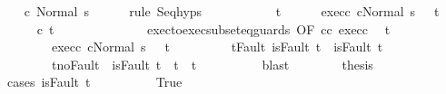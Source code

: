 \begin{isabellebody}
\ \ \isamarkupfalse%
\ {\isachardoublequoteopen}{\isasymGamma}{\isasymturnstile}c{}{\isasymdown}\ Normal\ s{\isachardoublequoteclose}\isanewline
\ \ \ \ \isamarkupfalse%
\ {\isacharparenleft}rule\ Seq{\isachardot}hyps{\isacharparenright}\isanewline
\ \ \isamarkupfalse%
\isanewline
\ \ \isacommand{{\isacharbraceleft}}\isamarkupfalse%
\isanewline
\ \ \ \ \isamarkupfalse%
\ t\isanewline
\ \ \ \ \isamarkupfalse%
\ exec{\isacharunderscore}c{}{\isacharcolon}\ {\isachardoublequoteopen}{\isasymGamma}{\isasymturnstile}{\isasymlangle}c{}{\isacharcomma}Normal\ s\ {\isasymrangle}\ {\isasymRightarrow}\ t{\isachardoublequoteclose}\isanewline
\ \ \ \ \isamarkupfalse%
\ {\isachardoublequoteopen}{\isasymGamma}{\isasymturnstile}c{}{\isasymdown}\ t{\isachardoublequoteclose}\isanewline
\ \ \ \ \isamarkupfalse%
\ {\isacharminus}\isanewline
\ \ \ \ \ \ \isamarkupfalse%
\ exec{\isacharunderscore}to{\isacharunderscore}exec{\isacharunderscore}subseteq{\isacharunderscore}guards\ {\isacharbrackleft}OF\ c{}{\isacharunderscore}c{}{\isacharprime}\ exec{\isacharunderscore}c{}{\isacharbrackright}\ \isamarkupfalse%
\ t{\isacharprime}\ \isanewline
\ \ \ \ \ \ \ \ exec{\isacharunderscore}c{}{\isacharprime}{\isacharcolon}\ {\isachardoublequoteopen}{\isasymGamma}{\isasymturnstile}{\isasymlangle}c{}{\isacharprime}{\isacharcomma}Normal\ s\ {\isasymrangle}\ {\isasymRightarrow}\ t{\isacharprime}{\isachardoublequoteclose}\ \isanewline
\ \ \ \ \ \ \ \ t{\isacharunderscore}Fault{\isacharcolon}\ {\isachardoublequoteopen}isFault\ t\ {\isasymlongrightarrow}\ isFault\ t{\isacharprime}{\isachardoublequoteclose}\ \isanewline
\ \ \ \ \ \ \ \ t{\isacharprime}{\isacharunderscore}noFault{\isacharcolon}\ {\isachardoublequoteopen}{\isasymnot}\ isFault\ t{\isacharprime}\ {\isasymlongrightarrow}\ t{\isacharprime}\ {\isacharequal}\ t{\isachardoublequoteclose}\isanewline
\ \ \ \ \ \ \ \ \isamarkupfalse%
\ blast\isanewline
\ \ \ \ \ \ \isamarkupfalse%
\ {\isacharquery}thesis\isanewline
\ \ \ \ \ \ \isamarkupfalse%
\ {\isacharparenleft}cases\ {\isachardoublequoteopen}isFault\ t{\isacharprime}{\isachardoublequoteclose}{\isacharparenright}\isanewline
\ \ \ \ \ \ \ \ \isamarkupfalse%
\ True\isanewline
\ \ \ \ \ \ \ \ \isamarkupfalse%

\end{isabellebody}
